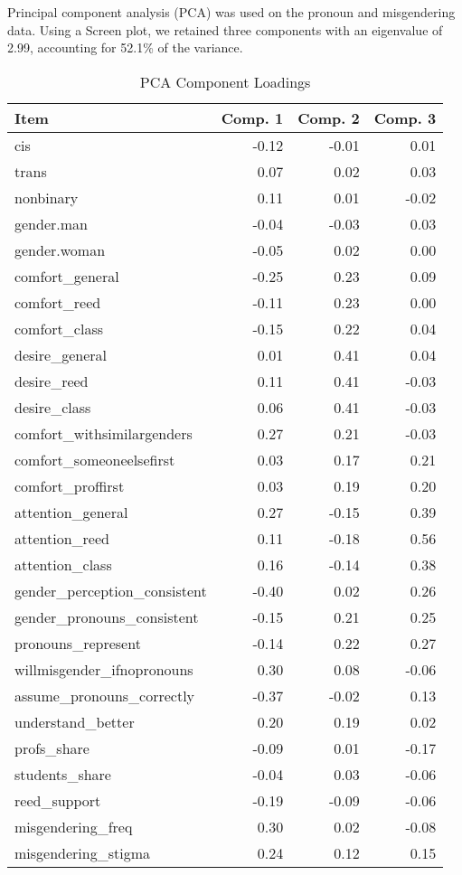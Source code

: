 \documentclass[12pt,twoside]{reedthesis}
\begin{document}
Principal component analysis (PCA) was used on the pronoun and misgendering data. Using a Screen plot, we retained three components with an eigenvalue of 2.99, accounting for 52.1\% of the variance.
\begin{table}

\caption{\label{tab:unnamed-chunk-9}PCA Component Loadings}
\centering
\begin{tabular}[t]{l|r|r|r}
\hline
Item & Comp. 1 & Comp. 2 & Comp. 3\\
\hline
cis & -0.12 & -0.01 & 0.01\\
\hline
trans & 0.07 & 0.02 & 0.03\\
\hline
nonbinary & 0.11 & 0.01 & -0.02\\
\hline
gender.man & -0.04 & -0.03 & 0.03\\
\hline
gender.woman & -0.05 & 0.02 & 0.00\\
\hline
comfort\_general & -0.25 & 0.23 & 0.09\\
\hline
comfort\_reed & -0.11 & 0.23 & 0.00\\
\hline
comfort\_class & -0.15 & 0.22 & 0.04\\
\hline
desire\_general & 0.01 & 0.41 & 0.04\\
\hline
desire\_reed & 0.11 & 0.41 & -0.03\\
\hline
desire\_class & 0.06 & 0.41 & -0.03\\
\hline
comfort\_withsimilargenders & 0.27 & 0.21 & -0.03\\
\hline
comfort\_someoneelsefirst & 0.03 & 0.17 & 0.21\\
\hline
comfort\_proffirst & 0.03 & 0.19 & 0.20\\
\hline
attention\_general & 0.27 & -0.15 & 0.39\\
\hline
attention\_reed & 0.11 & -0.18 & 0.56\\
\hline
attention\_class & 0.16 & -0.14 & 0.38\\
\hline
gender\_perception\_consistent & -0.40 & 0.02 & 0.26\\
\hline
gender\_pronouns\_consistent & -0.15 & 0.21 & 0.25\\
\hline
pronouns\_represent & -0.14 & 0.22 & 0.27\\
\hline
willmisgender\_ifnopronouns & 0.30 & 0.08 & -0.06\\
\hline
assume\_pronouns\_correctly & -0.37 & -0.02 & 0.13\\
\hline
understand\_better & 0.20 & 0.19 & 0.02\\
\hline
profs\_share & -0.09 & 0.01 & -0.17\\
\hline
students\_share & -0.04 & 0.03 & -0.06\\
\hline
reed\_support & -0.19 & -0.09 & -0.06\\
\hline
misgendering\_freq & 0.30 & 0.02 & -0.08\\
\hline
misgendering\_stigma & 0.24 & 0.12 & 0.15\\
\hline
\end{tabular}
\end{table}
\end{document}
